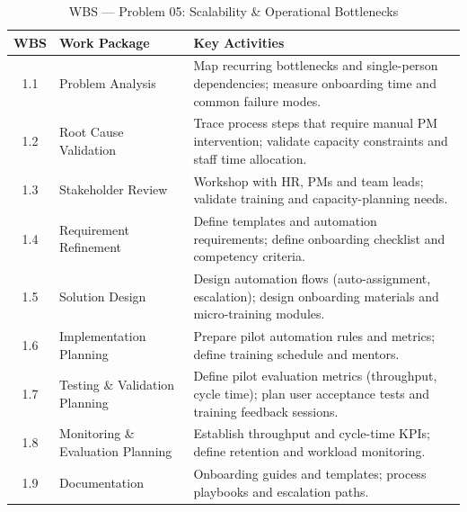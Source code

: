 \documentclass[12pt,a4paper]{report}
\begin{document}
\begin{table}[H]
\centering
\renewcommand{\arraystretch}{1.25}
\small
\begin{tabularx}{\textwidth}{|c|p{4.2cm}|X|}
\hline
\rowcolor{secondary}
\textbf{WBS} & \textbf{Work Package} & \textbf{Key Activities} \\
\hline
1.1 & Problem Analysis & Map recurring bottlenecks and single-person dependencies; measure onboarding time and common failure modes. \\
\hline
1.2 & Root Cause Validation & Trace process steps that require manual PM intervention; validate capacity constraints and staff time allocation. \\
\hline
1.3 & Stakeholder Review & Workshop with HR, PMs and team leads; validate training and capacity-planning needs. \\
\hline
1.4 & Requirement Refinement & Define templates and automation requirements; define onboarding checklist and competency criteria. \\
\hline
1.5 & Solution Design & Design automation flows (auto-assignment, escalation); design onboarding materials and micro-training modules. \\
\hline
1.6 & Implementation Planning & Prepare pilot automation rules and metrics; define training schedule and mentors. \\
\hline
1.7 & Testing \& Validation Planning & Define pilot evaluation metrics (throughput, cycle time); plan user acceptance tests and training feedback sessions. \\
\hline
1.8 & Monitoring \& Evaluation Planning & Establish throughput and cycle-time KPIs; define retention and workload monitoring. \\
\hline
1.9 & Documentation & Onboarding guides and templates; process playbooks and escalation paths. \\
\hline
\end{tabularx}
\caption{WBS --- Problem 05: Scalability \& Operational Bottlenecks}
\end{table}
\end{document}

